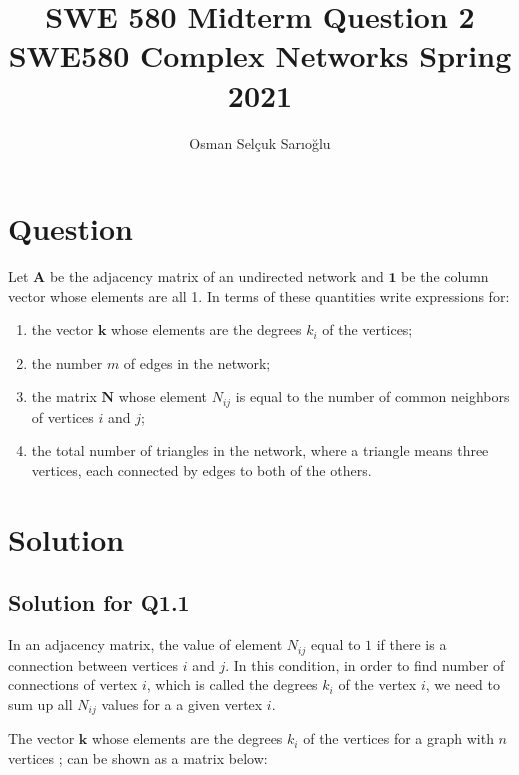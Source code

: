 \documentclass[11pt,a4,twocolumn]{article}
\title{
	SWE 580 Midterm Question 2\\
	SWE580 Complex Networks Spring 2021\\
}
\author{Osman Selçuk Sarıoğlu}
\theoremstyle{plain}
\theoremstyle{definition}
\theoremstyle{remark}
\begin{document}
\maketitle






\section{Question}

Let $\mathbf{A}$ be the adjacency matrix of an undirected network and 
$\mathbf{1}$ be the column vector whose elements are all 1. 
In terms of these quantities write expressions for:
\begin{enumerate}
	
	\item 
	the vector $\mathbf{k}$ whose elements are the degrees $k_{i}$ of the vertices; 
	
	\item 
	the number $m$ of edges in the network;
	
	\item 
	the matrix $\mathbf{N}$ whose element $N_{ij}$ is equal to the number of common neighbors of vertices $i$
	and $j$;
	
	\item 
	the total number of triangles in the network, 
	where a triangle means three vertices, 
	each connected by edges to both of the others.
	
\end{enumerate}

\section{Solution}

\subsection{Solution for Q1.1}

In an adjacency matrix, the value of element $N_{ij}$ equal to $1$ if there is a connection between vertices $i$ and $j$. In this condition, in order to find number of connections of vertex $i$, which is called the degrees  $k_{i}$ of the vertex  $i$, we need to sum up all $N_{ij}$ values for a a given vertex $i$.

\par
\noindent The vector $\mathbf{k}$ whose elements are the degrees $k_{i}$ of the vertices for a graph with $n$ vertices ; can be shown as a matrix below:
\end{document}

